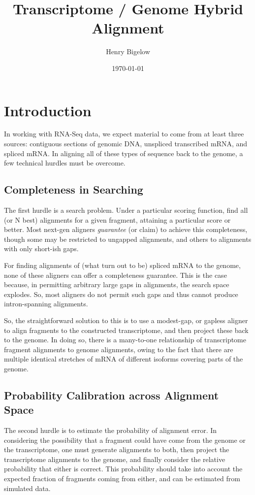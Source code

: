 \documentclass[10pt]{article}
\author{Henry Bigelow}
\title{Transcriptome / Genome Hybrid Alignment}
\date{\today}
\begin{document}
\maketitle

\section{Introduction}

In working with RNA-Seq data, we expect material to come from at least
three sources: contiguous sections of genomic DNA, unspliced
transcribed mRNA, and spliced mRNA. In aligning all of these types of
sequence back to the genome, a few technical hurdles must be overcome.

\subsection*{Completeness in Searching}

The first hurdle is a search problem. Under a particular scoring
function, find all (or N best) alignments for a given fragment,
attaining a particular score or better. Most next-gen aligners
\emph{guarantee} (or claim) to achieve this completeness, though some
may be restricted to ungapped alignments, and others to alignments
with only short-ish gaps.

For finding alignments of (what turn out to be) spliced mRNA to the
genome, none of these aligners can offer a completeness
guarantee. This is the case because, in permitting arbitrary large
gaps in alignments, the search space explodes. So, most aligners do
not permit such gaps and thus cannot produce intron-spanning
alignments.

So, the straightforward solution to this is to use a modest-gap, or
gapless aligner to align fragments to the constructed transcriptome,
and then project these back to the genome. In doing so, there is a
many-to-one relationship of transcriptome fragment alignments to
genome alignments, owing to the fact that there are multiple identical
stretches of mRNA of different isoforms covering parts of the genome.

\subsection*{Probability Calibration across Alignment Space}

The second hurdle is to estimate the probability of alignment
error. In considering the possibility that a fragment could have come
from the genome or the transcriptome, one must generate alignments to
both, then project the transcriptome alignments to the genome, and
finally consider the relative probability that either is correct. This
probability should take into account the expected fraction of
fragments coming from either, and can be estimated from simulated
data.
\end{document}
